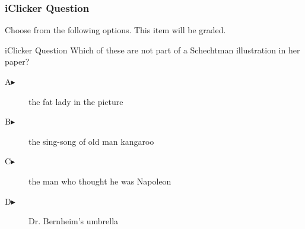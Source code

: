 \begin{frame}
  \frametitle{iClicker Question}
Choose from the following options. This item will be graded.
\begin{block}{iClicker Question}
Which of these are not part of a Schechtman illustration in her paper?
\end{block}
\begin{description}
\item[A\hspace{.2in}$\blacktriangleright$] the fat lady in the picture
\item[B\hspace{.2in}$\blacktriangleright$] the sing-song of old man kangaroo
\item[C\hspace{.2in}$\blacktriangleright$] the man who thought he was Napoleon
\item[D\hspace{.2in}$\blacktriangleright$] Dr. Bernheim's umbrella
\end{description}
\end{frame}
